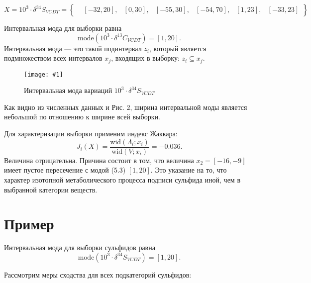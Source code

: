 \documentclass[a4paper,12pt]{article}
\newcommand{\plot}[3]{
    \begin{figure}[H]
        \begin{center}
            \texttt{[image: \#1]}
            \caption{#2}
            \label{#3}
        \end{center}
    \end{figure}
}
\begin{document}
    \[
    X = 10^3 \cdot \delta^{34}S_{VCDT} = \left\{
    \begin{aligned}
    &[-32, 20], &[0, 30], &[-55, 30], &[-54, 70], &[1, 23], &[-33, 23]
    \end{aligned}
    \right\}
    \]

    Интервальная мода для выборки равна
    \[
    \text{mode}(10^3 \cdot \delta^{13}C_{VCDT}) = [1, 20].
    \]
    Интервальная мода — это такой подинтервал \(z_i\), который является подмножеством всех интервалов \(x_j\), входящих в выборку: \(z_i \subseteq x_j\).
    \plot{sulfide_mode}{Интервальная мода вариаций \(10^3 \cdot \delta^{34}S_{VCDT}\)}{p:sulfide_mod}

    Как видно из численных данных и Рис. 2, ширина интервальной моды является небольшой по отношению к ширине всей выборки.

    Для характеризации выборки применим индекс Жаккара:
    \[
    J_i(X) = \frac{\text{wid}(\Lambda_i; x_i)}{\text{wid}(V; x_i)} = -0.036.
    \]
    Величина отрицательна. Причина состоит в том, что величина \(x_2 = [-16, -9]\) имеет пустое пересечение с модой (5.3) \([1, 20]\). Это указание на то, что характер изотопной метаболического процесса подписи сульфида иной, чем в выбранной категории веществ.

    \section{Пример}
    Интервальная мода для выборки сульфидов равна
    \[
    \text{mode}(10^3 \cdot \delta^{34}S_{VCDT}) = [1, 20].
    \]

    Рассмотрим меры сходства для всех подкатегорий сульфидов:
\end{document}
